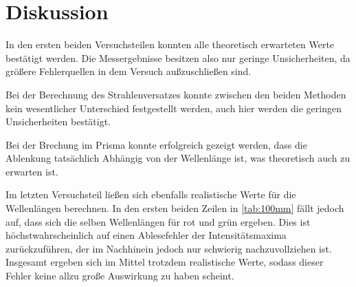 \section{Diskussion}
\label{sec:Diskussion}

In den ersten beiden Versuchsteilen konnten alle theoretisch erwarteten Werte bestätigt werden.
Die Messergebnisse besitzen also nur geringe Unsicherheiten, da größere
Fehlerquellen in dem Versuch außzuschließen sind.

Bei der Berechnung des Strahlenversatzes konnte zwischen den beiden Methoden kein wesentlicher Unterschied
festgestellt werden, auch hier werden die geringen Unsicherheiten bestätigt.

Bei der Brechung im Prisma konnte erfolgreich gezeigt werden, dass die Ablenkung tatsächlich
Abhängig von der Wellenlänge ist, was theoretisch auch zu erwarten ist.

Im letzten Versuchsteil ließen sich ebenfalls realistische Werte für die Wellenlängen berechnen.
In den ersten beiden Zeilen in \autoref{tab:100mm} fällt jedoch auf, dass sich die
selben Wellenlängen für rot und grün ergeben.
Dies ist höchstwahrscheinlich auf einen Ablesefehler der Intensitätsmaxima zurückzuführen, der im Nachhinein
jedoch nur schwierig nachzuvollziehen ist.
Insgesamt ergeben sich im Mittel trotzdem realistische Werte, sodass dieser Fehler keine allzu große Auswirkung
zu haben scheint.
